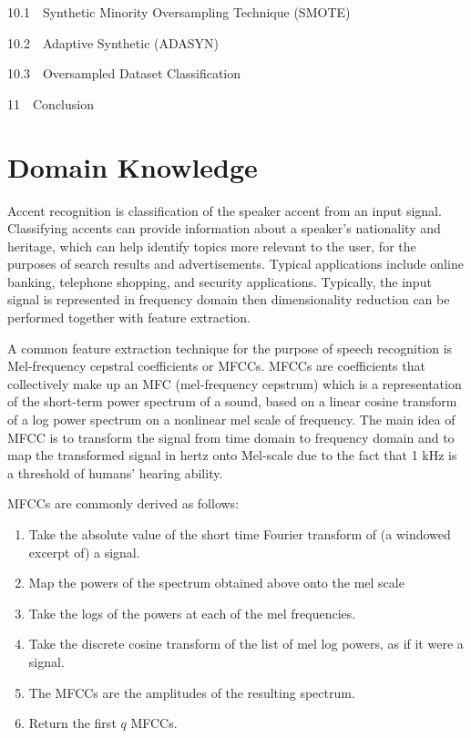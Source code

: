\documentclass[11pt]{article}
\providecommand{\tightlist}{%
      \setlength{\itemsep}{0pt}\setlength{\parskip}{0pt}}
\begin{document}
{{10.1~~}Synthetic Minority Oversampling Technique (SMOTE)}

{{10.2~~}Adaptive Synthetic (ADASYN)}

{{10.3~~}Oversampled Dataset Classification}

{{11~~}Conclusion}

    \hypertarget{domain-knowledge}{%
\section{Domain Knowledge}\label{domain-knowledge}}

Accent recognition is classification of the speaker accent from an input
signal. Classifying accents can provide information about a speaker's
nationality and heritage, which can help identify topics more relevant
to the user, for the purposes of search results and advertisements.
Typical applications include online banking, telephone shopping, and
security applications. Typically, the input signal is represented in
frequency domain then dimensionality reduction can be performed together
with feature extraction.

A common feature extraction technique for the purpose of speech
recognition is Mel-frequency cepstral coefficients or MFCCs. MFCCs are
coefficients that collectively make up an MFC (mel-frequency cepstrum)
which is a representation of the short-term power spectrum of a sound,
based on a linear cosine transform of a log power spectrum on a
nonlinear mel scale of frequency. The main idea of MFCC is to transform
the signal from time domain to frequency domain and to map the
transformed signal in hertz onto Mel-scale due to the fact that 1 kHz is
a threshold of humans' hearing ability.

MFCCs are commonly derived as follows:

\begin{enumerate}
\def\labelenumi{\arabic{enumi}.}
\tightlist
\item
  Take the absolute value of the short time Fourier transform of (a
  windowed excerpt of) a signal.
\item
  Map the powers of the spectrum obtained above onto the mel scale
\item
  Take the logs of the powers at each of the mel frequencies.
\item
  Take the discrete cosine transform of the list of mel log powers, as
  if it were a signal.
\item
  The MFCCs are the amplitudes of the resulting spectrum.
\item
  Return the first \(q\) MFCCs.
\end{enumerate}
\end{document}

